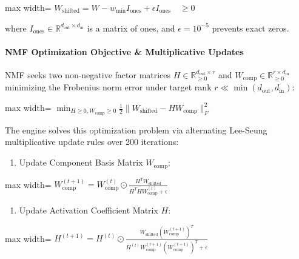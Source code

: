 \begin{center}
\begin{adjustbox}{max width=\columnwidth}
$\displaystyle
W_{\text{shifted}} = W - w_{\min} I_{\text{ones}} + \epsilon I_{\text{ones}} \quad \ge 0
$
\end{adjustbox}
\end{center}

where $I_{\text{ones}} \in \mathbb{R}^{d_{\text{out}} \times d_{\text{in}}}$ is a matrix of ones, and $\epsilon = 10^{-5}$ prevents exact zeros.

\paragraph{NMF Optimization Objective \& Multiplicative Updates}
NMF seeks two non-negative factor matrices $H \in \mathbb{R}_{\ge 0}^{d_{\text{out}} \times r}$ and $W_{\text{comp}} \in \mathbb{R}_{\ge 0}^{r \times d_{\text{in}}}$ minimizing the Frobenius norm error under target rank $r \ll \min(d_{\text{out}}, d_{\text{in}})$:

\begin{center}
\begin{adjustbox}{max width=\columnwidth}
$\displaystyle
\min_{H \ge 0, W_{\text{comp}} \ge 0} \frac{1}{2} \|W_{\text{shifted}} - H W_{\text{comp}}\|_F^2
$
\end{adjustbox}
\end{center}

The engine solves this optimization problem via alternating Lee-Seung multiplicative update rules over 200 iterations:

\begin{enumerate}
\item Update Component Basis Matrix $W_{\text{comp}}$:
\end{enumerate}
\begin{center}
\begin{adjustbox}{max width=\columnwidth}
$\displaystyle
W_{\text{comp}}^{(t+1)} = W_{\text{comp}}^{(t)} \odot \frac{H^T W_{\text{shifted}}}{H^T H W_{\text{comp}}^{(t)} + \epsilon}
$
\end{adjustbox}
\end{center}

\begin{enumerate}
\item Update Activation Coefficient Matrix $H$:
\end{enumerate}
\begin{center}
\begin{adjustbox}{max width=\columnwidth}
$\displaystyle
H^{(t+1)} = H^{(t)} \odot \frac{W_{\text{shifted}} (W_{\text{comp}}^{(t+1)})^T}{H^{(t)} W_{\text{comp}}^{(t+1)} (W_{\text{comp}}^{(t+1)})^T + \epsilon}
$
\end{adjustbox}
\end{center}

